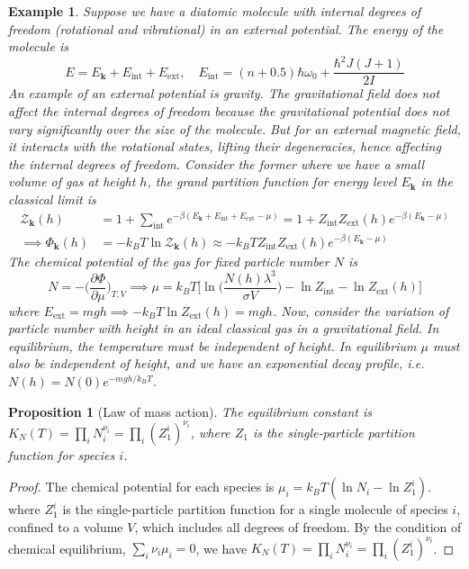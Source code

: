 \documentclass[a4paper]{article}
\newtheorem{eg}{Example}[section]
\theoremstyle{new}
\newtheorem{prop}{Proposition}[section]
\begin{document}
\begin{eg}
Suppose we have a diatomic molecule with internal degrees of freedom (rotational and vibrational) in an external potential. The energy of the molecule is
$$E=E_{\mathbf{k}}+E_{\text{int}}+E_{\text{ext}},\quad E_{\text{int}}=(n+0.5)\hbar\omega_0+\frac{\hbar^2J(J+1)}{2I}$$
An example of an external potential is gravity. The gravitational field does not affect the internal degrees of freedom because the gravitational potential does not vary significantly over the size of the molecule. But for an external magnetic field, it interacts with the rotational states, lifting their degeneracies, hence affecting the internal degrees of freedom. Consider the former where we have a small volume of gas at height $h$, the grand partition function for energy level $E_{\mathbf{k}}$ in the classical limit is
\begin{align}
\mathcal{Z}_{\mathbf{k}}(h)&=1+\sum_{\text{int}}e^{-\beta(E_{\mathbf{k}}+E_{\text{int}}+E_{\text{ext}}-\mu)}=1+Z_{\text{int}}Z_{\text{ext}}(h)e^{-\beta(E_{\mathbf{k}}-\mu)}\nonumber\\\implies\Phi_{\mathbf{k}}(h)&=-k_BT\ln\mathcal{Z}_{\mathbf{k}}(h)\approx-k_BTZ_{\text{int}}Z_{\text{ext}}(h)e^{-\beta(E_{\mathbf{k}}-\mu)}\nonumber
\end{align}
The chemical potential of the gas for fixed particle number $N$ is
$$N=-\bigg(\frac{\partial\Phi}{\partial\mu}\bigg)_{T,V}\implies\mu=k_BT\bigg[\ln\bigg(\frac{N(h)\lambda^3}{\sigma V}\bigg)-\ln Z_{\text{int}}-\ln Z_{\text{ext}}(h)\bigg]$$
where $E_{\text{ext}}=mgh\implies-k_BT\ln Z_{\text{ext}}(h)=mgh$. Now, consider the variation of particle number with height in an ideal classical gas in a gravitational field. In equilibrium, the temperature must be independent of height. In equilibrium $\mu$ must also be independent of height, and we have an exponential decay profile, i.e. $N(h)=N(0)e^{-mgh/k_BT}$.
\end{eg}
\begin{prop}[Law of mass action]
The equilibrium constant is $K_N(T)=\prod_iN_i^{\nu_i}=\prod_i(Z_1^i)^{\nu_i}$, where $Z_1$ is the single-particle partition function for species $i$.
\end{prop}
\begin{proof}
The chemical potential for each species is $\mu_i=k_BT(\ln N_i-\ln Z_1^i)$. where $Z_1^i$ is the single-particle partition function for a single molecule of species $i$, confined to a volume $V$, which includes all degrees of freedom. By the condition of chemical equilibrium, $\sum_i\nu_i\mu_i=0$, we have $K_N(T)=\prod_iN_i^{\nu_i}=\prod_i(Z_1^i)^{\nu_i}$.
\end{proof}
\end{document}

